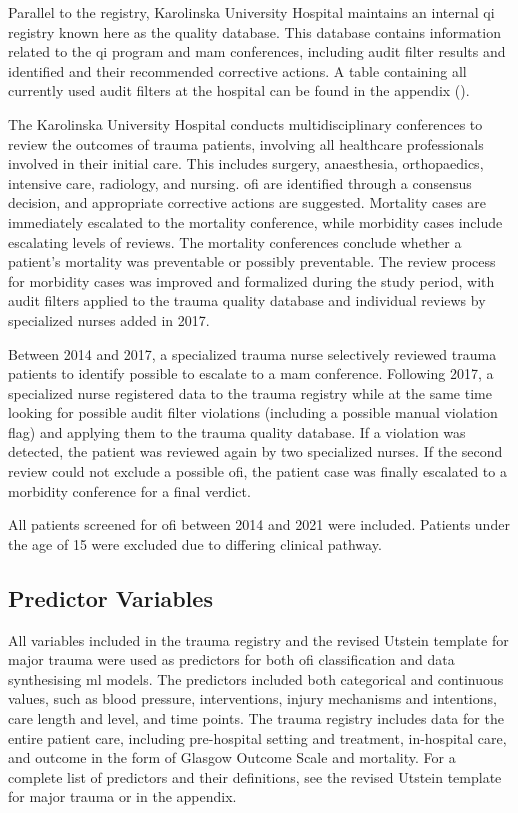 \documentclass[12pt, letterpaper]{article}
\begin{document}
Parallel to the registry, Karolinska University Hospital maintains an internal \acrshort{qi} registry known here as the quality database.  This database contains information related to the \acrshort{qi} program and \acrshort{mam} conferences, including audit filter results and identified  and their recommended corrective actions. A table containing all currently used audit filters at the hospital can be found in the appendix ().

The Karolinska University Hospital conducts multidisciplinary conferences to review the outcomes of trauma patients, involving all healthcare professionals involved in their initial care. This includes surgery, anaesthesia, orthopaedics, intensive care, radiology, and nursing. \acrshort{ofi} are identified through a consensus decision, and appropriate corrective actions are suggested. Mortality cases are immediately escalated to the mortality conference, while morbidity cases include escalating levels of reviews. The mortality conferences conclude whether a patient's mortality was preventable or possibly preventable. The review process for morbidity cases was improved and formalized during the study period, with audit filters applied to the trauma quality database and individual reviews by specialized nurses added in 2017.

Between 2014 and 2017, a specialized trauma nurse selectively reviewed trauma patients to identify possible  to escalate to a \acrshort{mam} conference. Following 2017, a specialized nurse registered data to the trauma registry while at the same time looking for possible audit filter violations (including a possible manual violation flag) and applying them to the trauma quality database. If a violation was detected, the patient was reviewed again by two specialized nurses. If the second review could not exclude a possible \acrshort{ofi}, the patient case was finally escalated to a morbidity conference for a final verdict.

All patients screened for \acrshort{ofi} between 2014 and 2021 were included. Patients under the age of 15 were excluded due to differing clinical pathway.

\subsection{Predictor Variables}
All variables included in the trauma registry and the revised Utstein template for major trauma were used as predictors for both \acrshort{ofi} classification and data synthesising \acrshort{ml} models. The predictors included both categorical and continuous values, such as blood pressure, interventions, injury mechanisms and intentions, care length and level, and time points. The trauma registry includes data for the entire patient care, including pre-hospital setting and treatment, in-hospital care, and outcome in the form of Glasgow Outcome Scale and mortality. For a complete list of predictors and their definitions, see the revised Utstein template for major trauma \cite{ringdal_utstein_2008} or  in the appendix.
\end{document}

